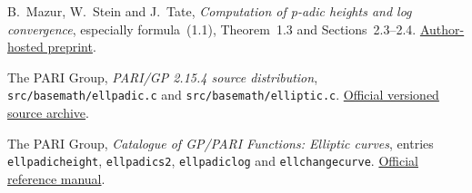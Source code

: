 B.~Mazur, W.~Stein and J.~Tate,
\emph{Computation of p-adic heights and log convergence},
especially formula~(1.1), Theorem~1.3 and Sections~2.3--2.4.
\href{https://bpb-us-e1.wpmucdn.com/sites.harvard.edu/dist/a/189/files/2023/01/Computation-of-p-Adic-Heights-and-Log-Convergence.pdf}{Author-hosted preprint}.

The PARI Group, \emph{PARI/GP 2.15.4 source distribution},
\texttt{src/basemath/ellpadic.c} and
\texttt{src/basemath/elliptic.c}.
\href{https://pari.math.u-bordeaux.fr/pub/pari/OLD/2.15/pari-2.15.4.tar.gz}{Official versioned source archive}.

The PARI Group, \emph{Catalogue of GP/PARI Functions: Elliptic curves},
entries \texttt{ellpadicheight}, \texttt{ellpadics2},
\texttt{ellpadiclog} and \texttt{ellchangecurve}.
\href{https://pari.math.u-bordeaux.fr/dochtml/html-stable/Elliptic_curves.html}{Official reference manual}.

